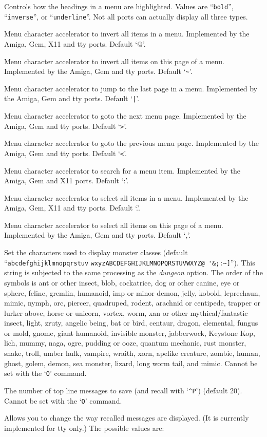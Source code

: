 Controls how the headings in a menu are highlighted.
Values are ``{\tt bold}'', ``{\tt inverse}'', or ``{\tt underline}''.
Not all ports can actually display all three types.
\item[\ib{menu\_invert\_all}]
Menu character accelerator to invert all items in a menu.
Implemented by the Amiga, Gem, X11 and tty ports.
Default `@'.
\item[\ib{menu\_invert\_page}]
Menu character accelerator to invert all items on this page of a menu.
Implemented by the Amiga, Gem and tty ports.
Default `\verb+~+'.
\item[\ib{menu\_last\_page}]
Menu character accelerator to jump to the last page in a menu.
Implemented by the Amiga, Gem and tty ports.
Default `\verb+|+'.
\item[\ib{menu\_next\_page}]
Menu character accelerator to goto the next menu page.
Implemented by the Amiga, Gem and tty ports.
Default `\verb+>+'.
\item[\ib{menu\_previous\_page}]
Menu character accelerator to goto the previous menu page.
Implemented by the Amiga, Gem and tty ports.
Default `\verb+<+'.
\item[\ib{menu\_search}]
Menu character accelerator to search for a menu item.
Implemented by the Amiga, Gem and X11 ports.
Default `:'.
\item[\ib{menu\_select\_all}]
Menu character accelerator to select all items in a menu.
Implemented by the Amiga, Gem, X11 and tty ports.
Default `.'.
\item[\ib{menu\_select\_page}]
Menu character accelerator to select all items on this page of a menu.
Implemented by the Amiga, Gem and tty ports.
Default `,'.
\item[\ib{monsters}]
Set the characters used to display monster classes (default
``\verb+abcdefghijklmnopqrstuv+
\verb+wxyzABCDEFGHIJKLMNOPQRSTUVWXYZ@ '&;:~]+'').
This string is subjected to the same processing as the {\it dungeon\/} option.
The order of the symbols is
ant or other insect, blob, cockatrice,
dog or other canine, eye or sphere, feline,
gremlin, humanoid, imp or minor demon,
jelly, kobold, leprechaun,
mimic, nymph, orc,
piercer, quadruped, rodent,
arachnid or centipede, trapper or lurker above, horse or unicorn,
vortex, worm, xan or other mythical/fantastic insect,
light, zruty,
angelic being, bat or bird, centaur,
dragon, elemental, fungus or mold,
gnome, giant humanoid, invisible monster,
jabberwock, Keystone Kop, lich,
mummy, naga, ogre,
pudding or ooze, quantum mechanic, rust monster,
snake, troll, umber hulk,
vampire, wraith, xorn,
apelike creature, zombie,
human, ghost, golem,
demon, sea monster, lizard,
long worm tail, and mimic.
Cannot be set with the `{\tt O}' command.
\item[\ib{msghistory}]
The number of top line messages to save (and recall with `{\tt \^{}P}')
(default 20). Cannot be set with the `{\tt O}' command.
\item[\ib{msg\_window}]
Allows you to change the way recalled messages are displayed.
(It is currently implemented for tty only.) The possible values are:

